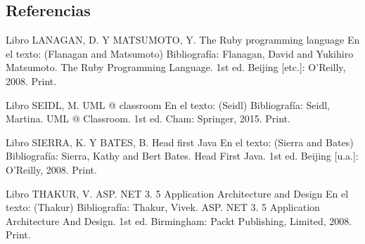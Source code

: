 \subsection{Referencias}


Libro
LANAGAN, D. Y MATSUMOTO, Y.
The Ruby programming language
En el texto: (Flanagan and Matsumoto)
Bibliografía: Flanagan, David and Yukihiro Matsumoto. The Ruby Programming Language. 1st ed. Beijing [etc.]: O'Reilly, 2008. Print.


Libro
SEIDL, M.
UML @ classroom
En el texto: (Seidl)
Bibliografía: Seidl, Martina. UML @ Classroom. 1st ed. Cham: Springer, 2015. Print.


Libro
SIERRA, K. Y BATES, B.
Head first Java
En el texto: (Sierra and Bates)
Bibliografía: Sierra, Kathy and Bert Bates. Head First Java. 1st ed. Beijing [u.a.]: O'Reilly, 2008. Print.


Libro
THAKUR, V.
ASP. NET 3. 5 Application Architecture and Design
En el texto: (Thakur)
Bibliografía: Thakur, Vivek. ASP. NET 3. 5 Application Architecture And Design. 1st ed. Birmingham: Packt Publishing, Limited, 2008. Print.